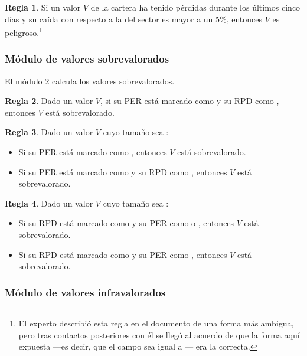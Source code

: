 \documentclass[a4paper, 11pt, titlepage]{article}
\theoremstyle{definition}
\newtheorem{regla}{Regla}
\begin{document}
    \begin{regla}
        Si un valor $V$ de la cartera ha tenido pérdidas durante los últimos cinco días y su caída con respecto a la del sector es mayor a un 5\%, entonces $V$ es peligroso.\footnote{El experto describió esta regla en el documento de una forma más ambigua, pero tras contactos posteriores con él se llegó al acuerdo de que la forma aquí expuesta ---es decir, que el campo  sea igual a --- era la correcta.}
    \end{regla}
  \subsubsection{Módulo de valores sobrevalorados}

  El módulo 2 calcula los valores sobrevalorados.
  \begin{regla}
        Dado un valor $V$, si su PER está marcado como  y su RPD como , entonces $V$ está sobrevalorado.
    \end{regla}

    \begin{regla}
        Dado un valor $V$ cuyo tamaño sea :
        \begin{itemize}
            \item Si su PER está marcado como , entonces $V$ está sobrevalorado.
            \item Si su PER está marcado como  y su RPD como , entonces $V$ está sobrevalorado.
        \end{itemize}
    \end{regla}

    \begin{regla}
        Dado un valor $V$ cuyo tamaño sea :
        \begin{itemize}
            \item Si su RPD está marcado como  y su PER como  o , entonces $V$ está sobrevalorado.
            \item Si su RPD está marcado como  y su PER como , entonces $V$ está sobrevalorado.
        \end{itemize}
    \end{regla}


  \subsubsection{Módulo de valores infravalorados}
\end{document}
